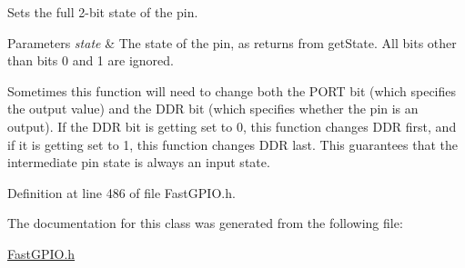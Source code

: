 Sets the full 2-\/bit state of the pin. 


\begin{DoxyParams}{Parameters}
{\em state} & The state of the pin, as returns from get\+State. All bits other than bits 0 and 1 are ignored.\\
\hline
\end{DoxyParams}
Sometimes this function will need to change both the P\+O\+RT bit (which specifies the output value) and the D\+DR bit (which specifies whether the pin is an output). If the D\+DR bit is getting set to 0, this function changes D\+DR first, and if it is getting set to 1, this function changes D\+DR last. This guarantees that the intermediate pin state is always an input state. 

Definition at line 486 of file Fast\+G\+P\+I\+O.\+h.



The documentation for this class was generated from the following file\+:\begin{DoxyCompactItemize}
\item 
\hyperlink{_fast_g_p_i_o_8h}{Fast\+G\+P\+I\+O.\+h}\end{DoxyCompactItemize}
